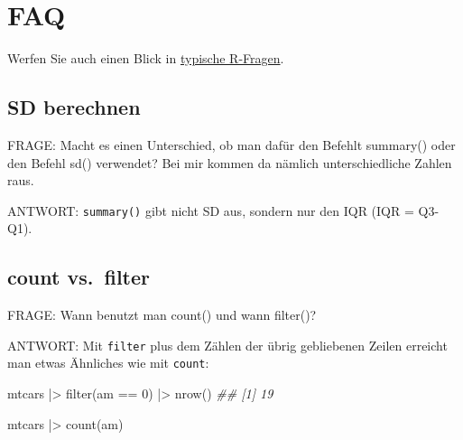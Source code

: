 \documentclass[
  a4paper,
]{scrbook}
\newenvironment{Shaded}{\begin{snugshade}}{\end{snugshade}}
\newcommand{\DecValTok}[1]{\textcolor[rgb]{0.68,0.00,0.00}{#1}}
\newcommand{\DocumentationTok}[1]{\textcolor[rgb]{0.37,0.37,0.37}{\textit{#1}}}
\newcommand{\FunctionTok}[1]{\textcolor[rgb]{0.28,0.35,0.67}{#1}}
\newcommand{\NormalTok}[1]{\textcolor[rgb]{0.00,0.23,0.31}{#1}}
\newcommand{\SpecialCharTok}[1]{\textcolor[rgb]{0.37,0.37,0.37}{#1}}
\theoremstyle{definition}
\theoremstyle{definition}
\theoremstyle{definition}
\theoremstyle{remark}
\begin{document}
\section{FAQ}\label{faq}

Werfen Sie auch einen Blick in \hyperref[sec-r-faq]{typische R-Fragen}.

\subsection{SD berechnen}\label{sd-berechnen}

FRAGE: Macht es einen Unterschied, ob man dafür den Befehlt summary()
oder den Befehl sd() verwendet? Bei mir kommen da nämlich
unterschiedliche Zahlen raus.

ANTWORT: \texttt{summary()} gibt nicht SD aus, sondern nur den IQR (IQR
= Q3-Q1).

\begin{Shaded}
\end{Shaded}

\subsection{count vs.~filter}\label{count-vs.-filter}

FRAGE: Wann benutzt man count() und wann filter()?

ANTWORT: Mit \texttt{filter} plus dem Zählen der übrig gebliebenen
Zeilen erreicht man etwas Ähnliches wie mit \texttt{count}:

\begin{Shaded}
\begin{Highlighting}[]
\NormalTok{mtcars }\SpecialCharTok{|\textgreater{}} 
  \FunctionTok{filter}\NormalTok{(am }\SpecialCharTok{==} \DecValTok{0}\NormalTok{) }\SpecialCharTok{|\textgreater{}} 
  \FunctionTok{nrow}\NormalTok{()}
\DocumentationTok{\#\# [1] 19}
\end{Highlighting}
\end{Shaded}

\begin{Shaded}
\begin{Highlighting}[]
\NormalTok{mtcars }\SpecialCharTok{|\textgreater{}} 
  \FunctionTok{count}\NormalTok{(am)}
\end{Highlighting}
\end{Shaded}
\end{document}
